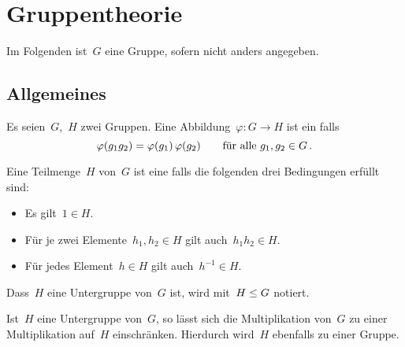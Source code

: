 \chapter{Gruppentheorie}


\begin{convention}
  Im Folgenden ist~$G$ eine Gruppe, sofern nicht anders angegeben.
\end{convention}

\section{Allgemeines}

\begin{definition}
  Es seien~$G$,~$H$ zwei Gruppen.
  Eine Abbildung~$\varphi \colon G \to H$ ist ein  falls
  \[
    \varphi(g_1 g_2) = \varphi(g_1) \, \varphi(g_2)
    \qquad
    \text{für alle~$g_1, g_2 \in G$} \,.
  \]
\end{definition}

\begin{definition}
  Eine Teilmenge~$H$ von~$G$ ist eine  falls die folgenden drei Bedingungen erfüllt sind:
  \begin{itemize}
    \item
      Es gilt~$1 \in H$.
    \item
      Für je zwei Elemente~$h_1, h_2 \in H$ gilt auch~$h_1 h_2 \in H$.
    \item
      Für jedes Element~$h \in H$ gilt auch~$h^{-1} \in H$.
  \end{itemize}
  Dass~$H$ eine Untergruppe von~$G$ ist, wird mit~$H \leq G$ notiert.
\end{definition}

Ist~$H$ eine Untergruppe von~$G$, so lässt sich die Multiplikation von~$G$ zu einer Multiplikation auf~$H$ einschränken.
Hierdurch wird~$H$ ebenfalls zu einer Gruppe.


